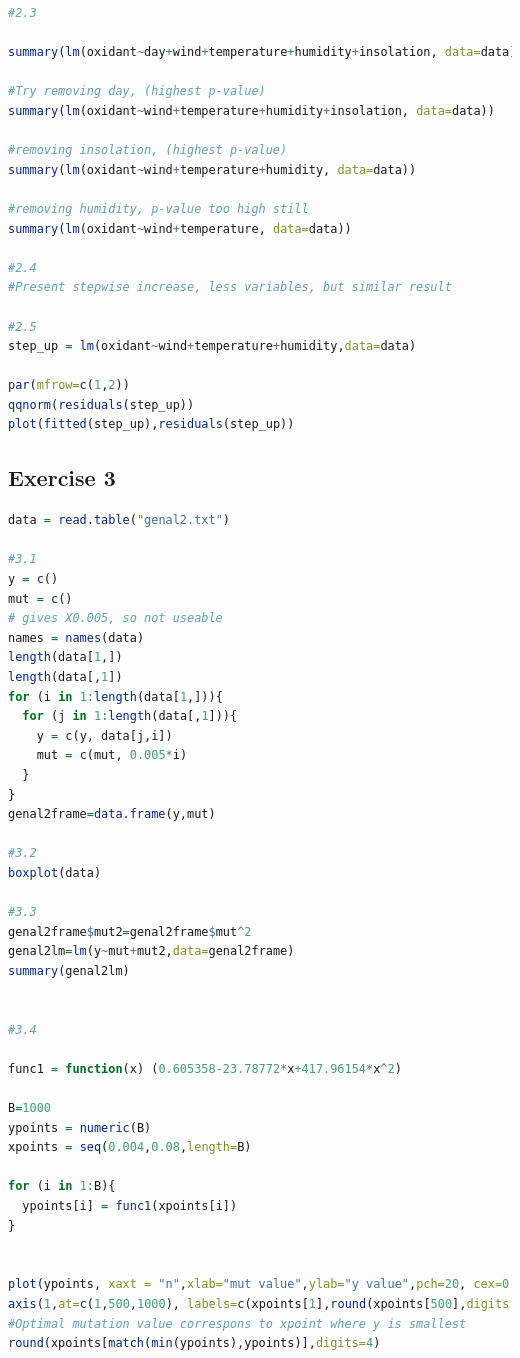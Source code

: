 \documentclass{article}
\begin{document}
\begin{lstlisting}[language=R]
#2.3

summary(lm(oxidant~day+wind+temperature+humidity+insolation, data=data))

#Try removing day, (highest p-value)
summary(lm(oxidant~wind+temperature+humidity+insolation, data=data))

#removing insolation, (highest p-value)
summary(lm(oxidant~wind+temperature+humidity, data=data))

#removing humidity, p-value too high still
summary(lm(oxidant~wind+temperature, data=data))

#2.4
#Present stepwise increase, less variables, but similar result

#2.5
step_up = lm(oxidant~wind+temperature+humidity,data=data)

par(mfrow=c(1,2))
qqnorm(residuals(step_up))
plot(fitted(step_up),residuals(step_up))
      \end{lstlisting}
    \subsection{Exercise 3}\label{sec:RE3}
      \begin{lstlisting}[language=R]
      data = read.table("genal2.txt")

#3.1
y = c()
mut = c()
# gives X0.005, so not useable
names = names(data)
length(data[1,])
length(data[,1])
for (i in 1:length(data[1,])){
  for (j in 1:length(data[,1])){
    y = c(y, data[j,i])
    mut = c(mut, 0.005*i)
  }
}
genal2frame=data.frame(y,mut)

#3.2
boxplot(data)

#3.3
genal2frame$mut2=genal2frame$mut^2
genal2lm=lm(y~mut+mut2,data=genal2frame)
summary(genal2lm)


#3.4

func1 = function(x) (0.605358-23.78772*x+417.96154*x^2)

B=1000
ypoints = numeric(B)
xpoints = seq(0.004,0.08,length=B)

for (i in 1:B){
  ypoints[i] = func1(xpoints[i])
}


plot(ypoints, xaxt = "n",xlab="mut value",ylab="y value",pch=20, cex=0.2, col="blue")
axis(1,at=c(1,500,1000), labels=c(xpoints[1],round(xpoints[500],digits = 4),xpoints[1000]))
#Optimal mutation value correspons to xpoint where y is smallest
round(xpoints[match(min(ypoints),ypoints)],digits=4)
      \end{lstlisting}
\end{document}
